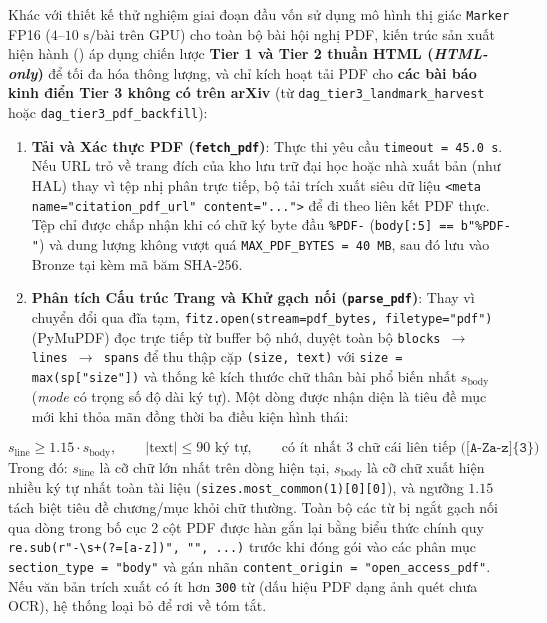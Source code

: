 Khác với thiết kế thử nghiệm giai đoạn đầu vốn sử dụng mô hình thị giác \texttt{Marker} FP16 ($4$--$10\text{ s/bài}$ trên GPU) cho toàn bộ bài hội nghị PDF, kiến trúc sản xuất hiện hành () áp dụng chiến lược \textbf{Tier 1 và Tier 2 thuần HTML (\textit{HTML-only})} để tối đa hóa thông lượng, và chỉ kích hoạt tải PDF cho \textbf{các bài báo kinh điển Tier 3 không có trên arXiv} (từ \texttt{dag\_tier3\_landmark\_harvest} hoặc \texttt{dag\_tier3\_pdf\_backfill}):
\begin{enumerate}[label=\textbf{\arabic*.}]
  \item \textbf{Tải và Xác thực PDF (\texttt{fetch\_pdf})}: Thực thi yêu cầu \texttt{timeout = 45.0 s}. Nếu URL trỏ về trang đích của kho lưu trữ đại học hoặc nhà xuất bản (như HAL) thay vì tệp nhị phân trực tiếp, bộ tải trích xuất siêu dữ liệu \texttt{<meta name="citation\_pdf\_url" content="...">} để đi theo liên kết PDF thực. Tệp chỉ được chấp nhận khi có chữ ký byte đầu \texttt{\%PDF-} (\texttt{body[:5] == b"\%PDF-"}) và dung lượng không vượt quá \texttt{MAX\_PDF\_BYTES = 40 MB}, sau đó lưu vào Bronze tại  kèm mã băm SHA-256.
  \item \textbf{Phân tích Cấu trúc Trang và Khử gạch nối (\texttt{parse\_pdf})}: Thay vì chuyển đổi qua đĩa tạm, \texttt{fitz.open(stream=pdf\_bytes, filetype="pdf")} (PyMuPDF) đọc trực tiếp từ buffer bộ nhớ, duyệt toàn bộ \texttt{blocks $\rightarrow$ lines $\rightarrow$ spans} để thu thập cặp \texttt{(size, text)} với \texttt{size = max(sp["size"])} và thống kê kích thước chữ thân bài phổ biến nhất $s_{\text{body}}$ (\textit{mode} có trọng số độ dài ký tự). Một dòng được nhận diện là tiêu đề mục mới khi thỏa mãn đồng thời ba điều kiện hình thái:
\end{enumerate}
\begin{equation}
  s_{\text{line}} \ge 1.15 \cdot s_{\text{body}}, \qquad |\text{text}| \le 90\text{ ký tự}, \qquad \text{có ít nhất } 3\text{ chữ cái liên tiếp } \bigl(\texttt{[A-Za-z]\{3\}}\bigr)
  \label{eq:ch2_pdf_heading}
\end{equation}
\noindent Trong đó: $s_{\text{line}}$ là cỡ chữ lớn nhất trên dòng hiện tại, $s_{\text{body}}$ là cỡ chữ xuất hiện nhiều ký tự nhất toàn tài liệu (\texttt{sizes.most\_common(1)[0][0]}), và ngưỡng $1.15$ tách biệt tiêu đề chương/mục khỏi chữ thường. Toàn bộ các từ bị ngắt gạch nối qua dòng trong bố cục 2 cột PDF được hàn gắn lại bằng biểu thức chính quy \texttt{re.sub(r"-\textbackslash s+(?=[a-z])", "", ...)} trước khi đóng gói vào các phân mục \texttt{section\_type = "body"} và gán nhãn \texttt{content\_origin = "open\_access\_pdf"}. Nếu văn bản trích xuất có ít hơn \texttt{300} từ (dấu hiệu PDF dạng ảnh quét chưa OCR), hệ thống loại bỏ để rơi về tóm tắt.

